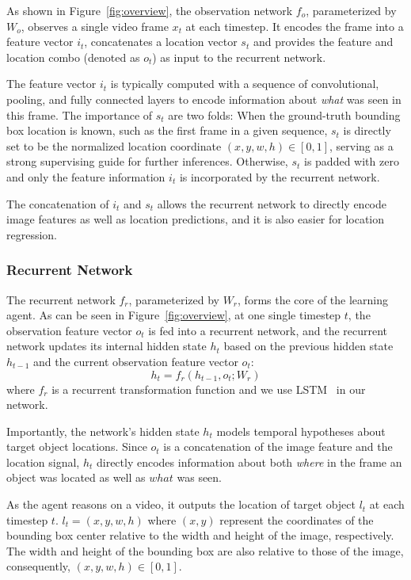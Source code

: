 \documentclass[10pt,twocolumn,letterpaper]{article}
\begin{document}
As shown in Figure~\ref{fig:overview}, the observation network $f_o$, parameterized by $W_o$, observes a single video frame $x_t$ at each timestep. It encodes the frame into a feature vector $i_t$, concatenates a location vector $s_t$ and provides the feature and location combo (denoted as $o_t$) as input to the recurrent network.

The feature vector $i_t$ is typically computed with a sequence of convolutional, pooling, and fully connected layers to encode information about \emph{what} was seen in this frame. The importance of $s_t$ are two folds: When the ground-truth bounding box location is known, such as the first frame in a given sequence, $s_t$ is directly set to be the normalized location coordinate $(x,y,w,h)\in [0,1]$, serving as a strong supervising guide for further inferences. Otherwise, $s_t$ is padded with zero and only the feature information $i_t$ is incorporated by  the recurrent network.

The concatenation of $i_t$ and $s_t$ allows the recurrent network to directly encode image features as well as location predictions, and it is also easier for location regression.

\subsubsection{Recurrent Network}
\label{subsec:recurnet}

The recurrent network $f_r$, parameterized by $W_r$, forms the core of the learning agent. As can be seen in Figure~\ref{fig:overview}, at one single timestep $t$, the observation feature vector $o_t$ is fed into a recurrent network, and the recurrent network updates its internal hidden state $h_t$ based on the previous hidden state $h_{t-1}$ and the current observation feature vector $o_t$: 
\begin{equation}
	h_t=f_{r}(h_{t-1},o_t;W_r)
    \label{eq:recurnet}
\end{equation}
where $f_r$ is a recurrent transformation function and we use LSTM~\cite{hochreiter1997long} in our network.

Importantly, the network's hidden state $h_t$ models temporal hypotheses about target object locations. Since $o_t$ is a concatenation of the image feature and the location signal, $h_t$ directly encodes information about both \emph{where} in the frame an object was located as well as $what$ was seen. 

As the agent reasons on a video, it outputs the location of target object $l_t$ at each timestep $t$. $l_t=(x,y,w,h)$
where $(x,y)$ represent the coordinates of the bounding box center relative to the width and height of the image, respectively. The width and height of the bounding box are also relative to those of the image, consequently, $(x,y,w,h)\in [0,1]$.
\end{document}
